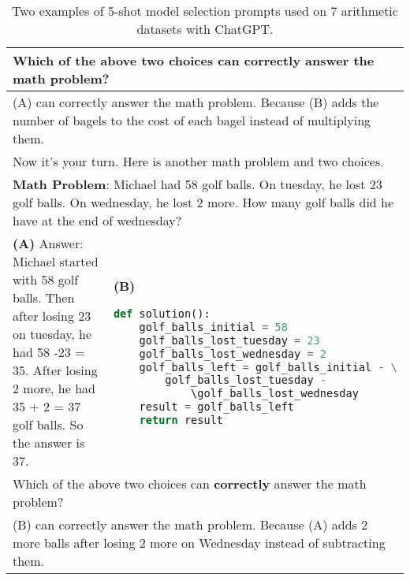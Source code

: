 \documentclass[11pt]{article}
\begin{document}
\begin{table*}[ht]
\begin{tabular}{p{}|p{}}
     \midrule
     \multicolumn{2}{p{0.92\textwidth}}{\small Which of the above two choices can \textbf{correctly} answer the math problem? }\\
     \midrule
      \multicolumn{2}{p{0.92\textwidth}}{\small (A) can correctly answer the math problem. Because (B) adds the number of bagels to the cost of each bagel instead of multiplying them.}\\
\multicolumn{2}{p{0.92\textwidth}}{\small Now it's your turn. Here is another math problem and two choices. }\\
        \multicolumn{2}{p{0.92\textwidth}}{\small \textbf{Math Problem}: Michael had 58 golf balls. On tuesday, he lost 23 golf balls. On wednesday, he lost 2 more. How many golf balls did he have at the end of wednesday? }\\
        \midrule
        \small \textbf{(A)} \newline
    \newline
    \small Answer: \newline
     \small Michael started with 58 golf balls.\newline
     \small Then after losing 23 on tuesday, he had 58 -23 = 35. \newline
     \small After losing 2 more, he had 35 + 2 = 37 golf balls. \newline
     \small So the answer is 37. \newline
&
    \small \textbf{(B)} 
    \lstset{style=mystyle}
     \begin{lstlisting}[language=Python]
def solution():
    golf_balls_initial = 58
    golf_balls_lost_tuesday = 23
    golf_balls_lost_wednesday = 2
    golf_balls_left = golf_balls_initial - \
        golf_balls_lost_tuesday - 
            \golf_balls_lost_wednesday
    result = golf_balls_left
    return result
     \end{lstlisting} \\

     \midrule
     \multicolumn{2}{p{0.92\textwidth}}{\small Which of the above two choices can \textbf{correctly} answer the math problem? }\\
\multicolumn{2}{p{0.92\textwidth}}{\small (B) can correctly answer the math problem. Because (A) adds 2 more balls after losing 2 more on Wednesday instead of subtracting them.}\\
     \bottomrule
    \end{tabular}
    \caption{Two examples of 5-shot model selection prompts used on 7 arithmetic datasets with ChatGPT.}

    \label{tab:chatgpt_example_math}
\end{table*}
\end{document}
